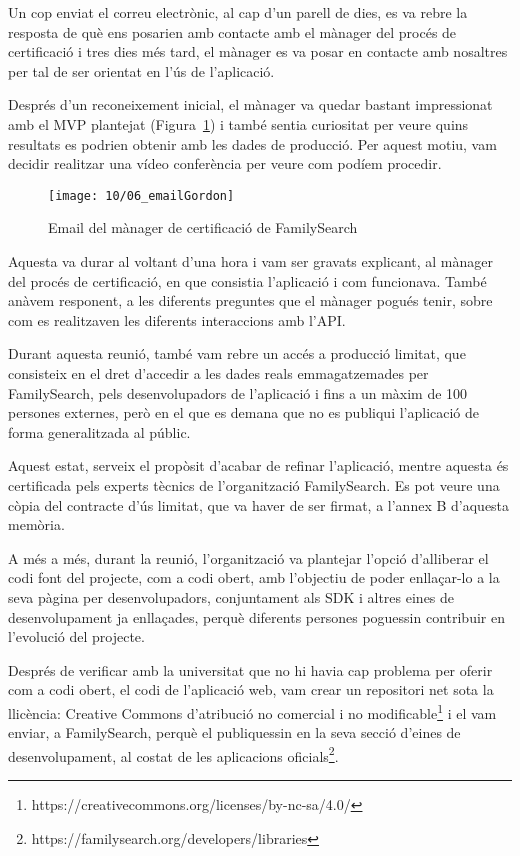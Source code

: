     Un cop enviat el correu electrònic, al cap d’un parell de dies, es va rebre la resposta de què ens posarien amb contacte amb el mànager del procés de certificació i tres dies més tard, el mànager es va posar en contacte amb nosaltres per tal de ser orientat en l’ús de l’aplicació.

    Després d’un reconeixement inicial, el mànager va quedar bastant impressionat amb el MVP plantejat (Figura~\ref{fig:gordonEmail}) i també sentia curiositat per veure quins resultats es podrien obtenir amb les dades de producció. Per aquest motiu, vam decidir realitzar una vídeo conferència per veure com podíem procedir.

    \begin{figure}[h]
        \texttt{[image: 10/06\_emailGordon]}
        \centering
        \caption{Email del mànager de certificació de FamilySearch}\label{fig:gordonEmail}
    \end{figure}

    Aquesta va durar al voltant d’una hora i vam ser gravats explicant, al mànager del procés de certificació, en que consistia l’aplicació i com funcionava. També anàvem responent, a les diferents preguntes que el mànager pogués tenir, sobre com es realitzaven les diferents interaccions amb l’API.

    Durant aquesta reunió, també vam rebre un accés a producció limitat, que consisteix en el dret d’accedir a les dades reals emmagatzemades per FamilySearch, pels desenvolupadors de l'aplicació i fins a un màxim de 100 persones externes, però en el que es demana que no es publiqui l’aplicació de forma generalitzada al públic.

    Aquest estat, serveix el propòsit d’acabar de refinar l’aplicació, mentre aquesta és certificada pels experts tècnics de l’organització FamilySearch. Es pot veure una còpia del contracte d’ús limitat, que va haver de ser firmat, a l’annex B d'aquesta memòria.

    A més a més, durant la reunió, l’organització va plantejar l’opció d’alliberar el codi font del projecte, com a codi obert, amb l’objectiu de poder enllaçar-lo a la seva pàgina per desenvolupadors, conjuntament als SDK i altres eines de desenvolupament ja enllaçades, perquè diferents persones poguessin contribuir en l’evolució del projecte.

    Després de verificar amb la universitat que no hi havia cap problema per oferir com a codi obert, el codi de l'aplicació web, vam crear un repositori net sota la llicència: Creative Commons d'atribució no comercial i no modificable\footnote{https://creativecommons.org/licenses/by-nc-sa/4.0/} i el vam enviar, a FamilySearch, perquè el publiquessin en la seva secció d'eines de desenvolupament, al costat de les aplicacions oficials\footnote{https://familysearch.org/developers/libraries}.

